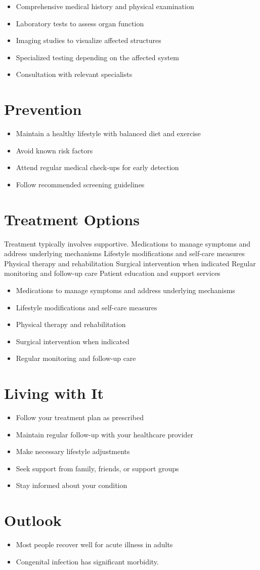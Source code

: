 \begin{itemize}[noitemsep]
  \item Comprehensive medical history and physical examination
  \item Laboratory tests to assess organ function
  \item Imaging studies to visualize affected structures
  \item Specialized testing depending on the affected system
  \item Consultation with relevant specialists
\end{itemize}
\section{Prevention}
\begin{itemize}[noitemsep]
  \item Maintain a healthy lifestyle with balanced diet and exercise
  \item Avoid known risk factors
  \item Attend regular medical check-ups for early detection
  \item Follow recommended screening guidelines
\end{itemize}
\section{Treatment Options}
Treatment typically involves supportive. Medications to manage symptoms and address underlying mechanisms Lifestyle modifications and self-care measures Physical therapy and rehabilitation Surgical intervention when indicated Regular monitoring and follow-up care Patient education and support services

\begin{itemize}[noitemsep]
  \item Medications to manage symptoms and address underlying mechanisms
  \item Lifestyle modifications and self-care measures
  \item Physical therapy and rehabilitation
  \item Surgical intervention when indicated
  \item Regular monitoring and follow-up care
\end{itemize}
\section{Living with It}
\begin{itemize}[noitemsep]
  \item Follow your treatment plan as prescribed
  \item Maintain regular follow-up with your healthcare provider
  \item Make necessary lifestyle adjustments
  \item Seek support from family, friends, or support groups
  \item Stay informed about your condition
\end{itemize}
\section{Outlook}
\begin{itemize}[noitemsep]
  \item Most people recover well for acute illness in adults
  \item Congenital infection has significant morbidity.
\end{itemize}

